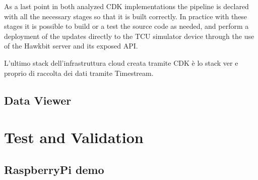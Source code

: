 As a last point in both analyzed CDK implementations the pipeline is declared with all the necessary stages so that it is built correctly. In practice with these stages it is possible to build or a test the source code as needed, and perform a deployment of the updates directly to the TCU simulator device through the use of the Hawkbit server and its exposed API.

L'ultimo stack dell'infrastruttura cloud creata tramite CDK è lo stack ver e proprio di raccolta dei dati tramite Timestream. 
\subsection{Data Viewer}

\section{Test and Validation}
\subsection{RaspberryPi demo}